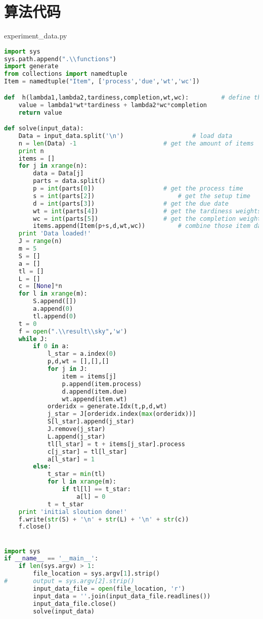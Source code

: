 \chapter{算法代码}
\begin{asparaenum}
\item experiment\_data.py
\end{asparaenum}
\begin{lstlisting}[language = Python]
import sys
sys.path.append(".\\functions")
import generate
from collections import namedtuple
Item = namedtuple("Item", ['process','due','wt','wc'])

def  h(lambda1,lambda2,tardiness,completion,wt,wc):			# define the contribution of one item for the obj function
	value = lambda1*wt*tardiness + lambda2*wc*completion
	return value

def solve(input_data):
	Data = input_data.split('\n')					# load data
	n = len(Data) -1						# get the amount of items
	print n
	items = []
	for j in xrange(n):
		data = Data[j]
		parts = data.split()
		p = int(parts[0])					# get the process time
		s = int(parts[2])						# get the setup time
		d = int(parts[3])					# get the due date
		wt = int(parts[4])					# get the tardiness weights
		wc = int(parts[5])					# get the completion weights
		items.append(Item(p+s,d,wt,wc))			# combine those item data
	print 'Data loaded!'
	J = range(n)
	m = 5
	S = []
	a = []
	tl = []
	L = []
	c = [None]*n
	for l in xrange(m):
		S.append([])
		a.append(0)
		tl.append(0)
	t = 0
	f = open(".\\result\\sky",'w')
	while J:
		if 0 in a:
			l_star = a.index(0)
			p,d,wt = [],[],[]
			for j in J:				
				item = items[j]
				p.append(item.process)
				d.append(item.due)
				wt.append(item.wt)
			orderidx = generate.Idx(t,p,d,wt)
			j_star = J[orderidx.index(max(orderidx))]
			S[l_star].append(j_star)
			J.remove(j_star)
			L.append(j_star)
			tl[l_star] = t + items[j_star].process
			c[j_star] = tl[l_star]
			a[l_star] = 1
		else:
			t_star = min(tl)
			for l in xrange(m):
				if tl[l] == t_star:
					a[l] = 0
			t = t_star
	print 'initial sloution done!'
	f.write(str(S) + '\n' + str(L) + '\n' + str(c))
	f.close()


import sys
if __name__ == '__main__':
	if len(sys.argv) > 1:
		file_location = sys.argv[1].strip()
#		output = sys.argv[2].strip()
		input_data_file = open(file_location, 'r')
		input_data = ''.join(input_data_file.readlines())
		input_data_file.close()
		solve(input_data)
\end{lstlisting}
